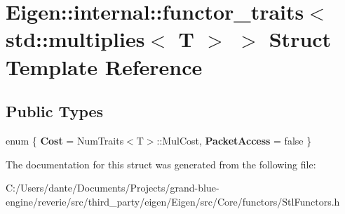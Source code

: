 \hypertarget{struct_eigen_1_1internal_1_1functor__traits_3_01std_1_1multiplies_3_01_t_01_4_01_4}{}\section{Eigen\+::internal\+::functor\+\_\+traits$<$ std\+::multiplies$<$ T $>$ $>$ Struct Template Reference}
\label{struct_eigen_1_1internal_1_1functor__traits_3_01std_1_1multiplies_3_01_t_01_4_01_4}
\subsection*{Public Types}
\begin{DoxyCompactItemize}
\item 
\mbox{\label{struct_eigen_1_1internal_1_1functor__traits_3_01std_1_1multiplies_3_01_t_01_4_01_4_ac040e6073bc00a4205d5a4ea092127e4}} 
enum \{ {\bfseries Cost} = Num\+Traits$<$T$>$\+::Mul\+Cost, 
{\bfseries Packet\+Access} = false
 \}
\end{DoxyCompactItemize}


The documentation for this struct was generated from the following file\+:\begin{DoxyCompactItemize}
\item 
C\+:/\+Users/dante/\+Documents/\+Projects/grand-\/blue-\/engine/reverie/src/third\+\_\+party/eigen/\+Eigen/src/\+Core/functors/Stl\+Functors.\+h\end{DoxyCompactItemize}

